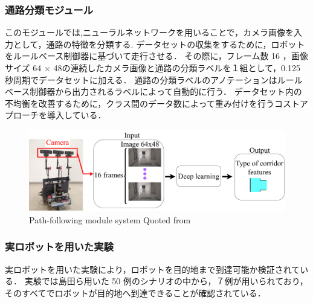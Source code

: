 \subsubsection{通路分類モジュール}
このモジュールでは,ニューラルネットワークを用いることで，カメラ画像を入力として，通路の特徴を分類する.
データセットの収集をするために，ロボットをルールベース制御器に基づいて走行させる．
その際に，フレーム数 16 ，画像サイズ 64 × 48の連続したカメラ画像と通路の分類ラベルを１組として，0.125 秒周期でデータセットに加える．
通路の分類ラベルのアノテーションはルールベース制御器から出力されるラベルによって自動的に行う．
データセット内の不均衡を改善するために，クラス間のデータ数によって重み付けを行うコストアプローチを導入している．

\begin{figure}[htbp]
  \centering
   \includegraphics[width=130mm]{images/pdf/haruyama/intersection_sys.pdf}
   \caption{Path-following module system Quoted from \cite{haruyama2023}}
   \label{fig:intersection}
\end{figure}

\subsubsection{実ロボットを用いた実験}
実ロボットを用いた実験により，ロボットを目的地まで到達可能か検証されている．
実験では島田ら用いた 50 例のシナリオの中から，７例が用いられており，そのすべてでロボットが目的地へ到達できることが確認されている．